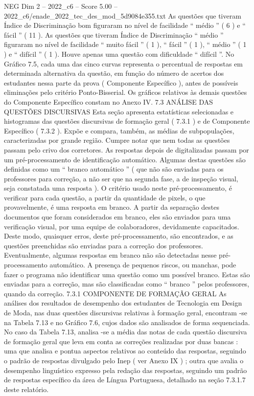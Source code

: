 \begin{textsample}{NEG Dim 2 – 2022\_c6 – Score 5.00 – 2022\_c6/enade\_2022\_tec\_des\_mod\_5d9084e355.txt}
As questões que tiveram Índice de Discriminação bom figuraram no nível de facilidade “ médio ” ( 6 ) e “ fácil ” ( 11 ).
As questões que tiveram Índice de Discriminação “ médio ” figuraram no nível de facilidade “ muito fácil ” ( 1 ), “ fácil ” ( 1 ), “ médio ” ( 1 ) e “ difícil ” ( 1 ).
Houve apenas uma questão com dificuldade “ difícil ”.
No Gráfico 7.5, cada uma das cinco curvas representa o percentual de respostas em determinada alternativa da questão, em função do número de acertos dos estudantes nessa parte da prova ( Componente Específico ), antes de possíveis eliminações pelo critério Ponto-Bisserial.
Os gráficos relativos às demais questões do Componente Específico constam no Anexo IV. 7.3 ANÁLISE DAS QUESTÕES DISCURSIVAS Esta seção apresenta estatísticas selecionadas e histogramas das questões discursivas de formação geral ( 7.3.1 ) e de Componente Específico ( 7.3.2 ).
Expõe e compara, também, as médias de subpopulações, caracterizadas por grande região.
Cumpre notar que nem todas as questões passam pelo crivo dos corretores.
As respostas depois de digitalizadas passam por um pré-processamento de identificação automático.
Algumas destas questões são definidas como um “ branco automático ” ( que não são enviadas para os professores para correção, a não ser que na segunda fase, a de inspeção visual, seja constatada uma resposta ).
O critério usado neste pré-processamento, é verificar para cada questão, a partir da quantidade de pixels, o que provavelmente, é uma resposta em branco.
A partir da separação destes documentos que foram considerados em branco, eles são enviados para uma verificação visual, por uma equipe de colaboradores, devidamente capacitados.
Deste modo, quaisquer erros, deste pré-processamento, são encontrados, e as questões preenchidas são enviadas para a correção dos professores.
Eventualmente, algumas respostas em branco não são detectadas nesse pré-processamento automático.
A presença de pequenos riscos, ou manchas, pode fazer o programa não identificar uma questão como um possível branco.
Estas são enviadas para a correção, mas são classificadas como “ branco ” pelos professores, quando da correção. 7.3.1 COMPONENTE DE FORMAÇÃO GERAL As análises dos resultados de desempenho dos estudantes de Tecnologia em Design de Moda, nas duas questões discursivas relativas à formação geral, encontram -se na Tabela 7.13 e no Gráfico 7.6, cujos dados são analisados de forma sequenciada.
No caso da Tabela 7.13, analisa -se a média das notas de cada questão discursiva de formação geral que leva em conta as correções realizadas por duas bancas : uma que analisa e pontua aspectos relativos ao conteúdo das respostas, seguindo o padrão de respostas divulgado pelo Inep ( ver Anexo IX ) ; outra que avalia o desempenho linguístico expresso pela redação das respostas, seguindo um padrão de respostas específico da área de Língua Portuguesa, detalhado na seção 7.3.1.7 deste relatório.

\end{textsample}
